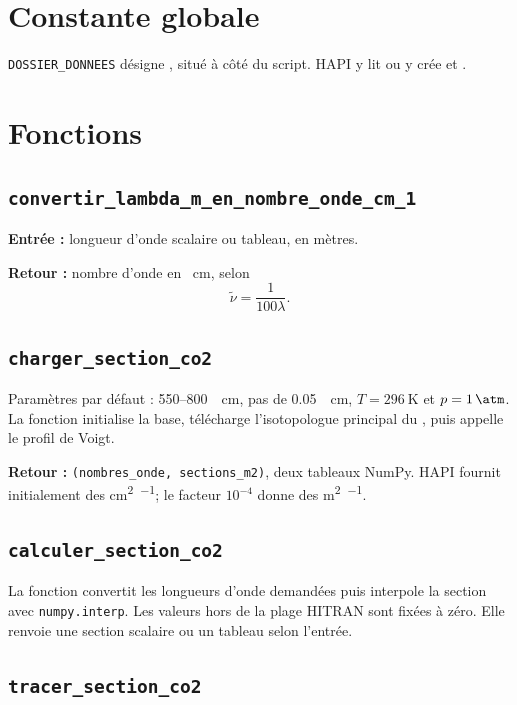 \documentclass[11pt,a4paper]{article}
\begin{document}
\section{Constante globale}

\texttt{DOSSIER\_DONNEES} désigne , situé à côté du
script. HAPI y lit ou y crée  et .

\section{Fonctions}

\subsection{\texttt{convertir\_lambda\_m\_en\_nombre\_onde\_cm\_1}}

\textbf{Entrée :} longueur d'onde scalaire ou tableau, en mètres.

\textbf{Retour :} nombre d'onde en \si{\per\centi\metre}, selon
\begin{equation}
  \widetilde\nu=\frac{1}{100\lambda}.
\end{equation}

\subsection{\texttt{charger\_section\_co2}}

Paramètres par défaut : 550--\SI{800}{\per\centi\metre}, pas de
\SI{0.05}{\per\centi\metre}, $T=\SI{296}{\kelvin}$ et
$p=\SI{1}{\atm}$. La fonction initialise la base, télécharge
l'isotopologue principal du , puis appelle le profil de Voigt.

\textbf{Retour :} \texttt{(nombres\_onde, sections\_m2)}, deux tableaux NumPy.
HAPI fournit initialement des \si{\centi\metre\squared\per\molecule}; le
facteur $10^{-4}$ donne des \si{\metre\squared\per\molecule}.

\subsection{\texttt{calculer\_section\_co2}}

La fonction convertit les longueurs d'onde demandées puis interpole la
section avec \texttt{numpy.interp}. Les valeurs hors de la plage HITRAN sont
fixées à zéro. Elle renvoie une section scalaire ou un tableau selon l'entrée.

\subsection{\texttt{tracer\_section\_co2}}
\end{document}
